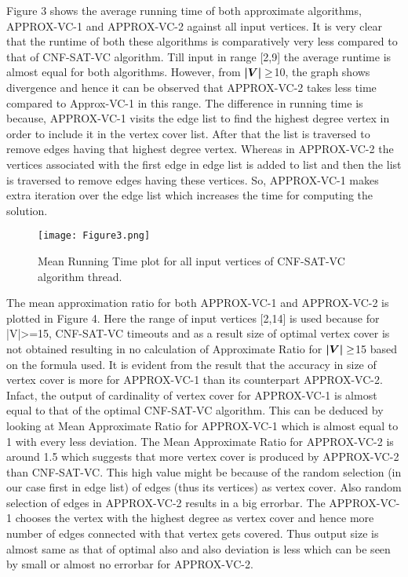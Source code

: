 \documentclass{article}
\begin{document}
Figure 3 shows the average running time of both approximate algorithms, APPROX-VC-1 and APPROX-VC-2 against all input vertices. It is very clear that the runtime of both these algorithms is comparatively very less compared to that of CNF-SAT-VC algorithm. Till input in range [2,9] the average runtime is almost equal for both algorithms. However, from $\boldsymbol{$$|V|$$} \geq $10, the graph shows divergence and hence it can be observed that APPROX-VC-2 takes less time compared to Approx-VC-1 in this range. The difference in running time is because, APPROX-VC-1 visits the edge list to find the highest degree vertex in order to include it in the vertex cover list. After that the list is traversed to remove edges having that highest degree vertex. Whereas in APPROX-VC-2 the vertices associated with the first edge in edge list is added to list and then the list is traversed to remove edges having these vertices. So, APPROX-VC-1 makes extra iteration over the edge list which increases the time for computing the solution. 

\begin{figure}[H]
\centering
\texttt{[image: Figure3.png]}
\caption{\label{fig:figure2}Mean Running Time plot for all input vertices of CNF-SAT-VC algorithm thread.}
\end{figure}

The mean approximation ratio for both APPROX-VC-1 and APPROX-VC-2 is plotted in Figure 4. Here the range of input vertices [2,14] is used because for |V|>=15, CNF-SAT-VC timeouts and as a result size of optimal vertex cover is not obtained resulting in no calculation of Approximate Ratio for $\boldsymbol{$$|V|$$} \geq $15 based on the formula used. It is evident from the result that the accuracy in size of vertex cover is more for APPROX-VC-1 than its counterpart APPROX-VC-2. Infact, the output of cardinality of vertex cover for APPROX-VC-1 is almost equal to that of the optimal CNF-SAT-VC algorithm. This can be deduced by looking at Mean Approximate Ratio for APPROX-VC-1 which is almost equal to 1 with every less deviation. The Mean Approximate Ratio for APPROX-VC-2 is around 1.5 which suggests that more vertex cover is produced by APPROX-VC-2 than CNF-SAT-VC. This high value might be because of the random selection (in our case first in edge list) of edges (thus its vertices) as vertex cover. Also random selection of edges in APPROX-VC-2 results in a big errorbar. The APPROX-VC-1 chooses the vertex with the highest degree as vertex cover and hence more number of edges connected with that vertex gets covered. Thus output size is almost same as that of optimal also and also deviation is less which can be seen by small or almost no errorbar for APPROX-VC-2.
\end{document}
